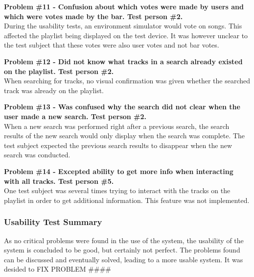 \noindent\textbf{Problem \#11 - Confusion about which votes were made by users and which were
    votes made by the bar. Test person \#2.}\\
  During the usability tests, an environment simulator would vote on
  songs. This affected the playlist being displayed on the test
  device. It was however unclear to the test subject that these votes
  were also user votes and not bar votes.

\noindent\textbf{Problem \#12 - Did not know what tracks in a search already existed on the
    playlist. Test person \#2.}\\
  When searching for tracks, no visual confirmation was given whether
  the searched track was already on the playlist.

\noindent\textbf{Problem \#13 - Was confused why the search did not
  clear when the user made a new search. Test person \#2.}\\
  When a new search was performed right after a previous search, the
  search results of the new search would only display when the search
  was complete. The test subject expected the previous search results
  to disappear when the new search was conducted.

\noindent\textbf{Problem \#14 - Excepted ability to get more info when interacting with all
    tracks. Test person \#5.}\\
  One test subject was several times trying to interact with the
  tracks on the playlist in order to get additional information. This
  feature was not implemented.

\subsubsection{Usability Test Summary}

As no critical problems were found in the use of the system, the
usability of the system is concluded to be good, but certainly not
perfect. The problems found can be discussed and eventually
solved, leading to a more usable system.
It was desided to FIX PROBLEM ####